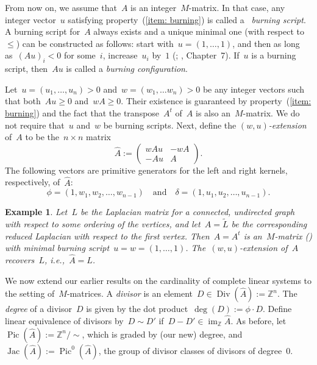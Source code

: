 \documentclass{amsart}
\newtheorem{Example}[thm]{Example}
\newenvironment{example}
  {\begin{Example}\rm}{\end{Example}}
\DeclareMathOperator{\Pic}{Pic}
\DeclareMathOperator{\Jac}{Jac}
\DeclareMathOperator{\Div}{Div}
\DeclareMathOperator{\im}{im}
\newcommand{\Z}{\mathbb{Z}}
\newcommand{\tL}{\tilde{L}}
\newcommand{\wA}{\widehat{A}}
\begin{document}
From now on, we assume that~$A$ is an integer~$M$-matrix.  In that case, any
integer vector~$u$ satisfying property~(\ref{item: burning}) is called a~{\em
burning script}.  A burning script for~$A$ always exists and a unique minimal
one (with respect to~$\leq$) can be constructed as follows: start
with~$u=(1,\dots,1)$, and then as long as~$(Au)_i<0$ for some~$i$,
increase~$u_i$ by~$1$ (\cite{PPW}; \cite{Corry}, Chapter~7). If~$u$ is a burning
script, then~$Au$ is called a {\em burning configuration}.

Let~$u=(u_1,\dots,u_n)>0$ and~$w=(w_1,\dots w_n)>0$ be any integer vectors such that both~$Au\geq0$
and~$wA\geq0$. Their existence is guaranteed by property~(\ref{item: burning}) and
the fact that the transpose~$A^t$ of~$A$ is also an~$M$-matrix. We
do not require that~$u$ and~$w$ be burning scripts.  Next, define the {\em
$(w,u)$-extension} of~$A$ to be the~$n\times n$ matrix
\[
  \wA:=
  \left(\begin{array}{c|c}
      wAu&-wA\\\hline
      -Au&A
  \end{array} \right).
\]
The following vectors are primitive generators for the left and right kernels,
respectively, of~$\wA$:
\[
  \phi=(1,w_1,w_2,\dots,w_{n-1})
  \quad\text{and}\quad
  \delta=(1,u_1,u_2,\dots,u_{n-1}).
\]

\begin{example} Let~$L$ be the Laplacian matrix for a connected, undirected
  graph with respect to some ordering of the vertices, and let~$A=\tL$ be the
  corresponding reduced Laplacian with respect to the first vertex.
  Then~$A=A^t$ is an~$M$-matrix (\cite{Guzman}) with minimal
  burning script~$u=w=(1,\dots,1)$.  The~$(w,u)$-extension of~$A$
  recovers~$L$, i.e.,~$\wA=L$. 
\end{example}

We now extend our earlier results on the cardinality of complete linear systems
to the setting of~$M$-matrices.  A {\em divisor} is an
element~$D\in\Div(\wA):=\Z^n$.  The {\em degree} of a divisor~$D$ is given by
the dot product~$\deg(D):=\phi\cdot D$.  Define linear equivalence of divisors
by~$D\sim D'$ if~$D-D'\in\im_{\Z}\wA$.  As before,
let~$\Pic(\wA):=\Z^{n}/\!\sim$, which is graded by (our new) degree,
and~$\Jac(\wA):=\Pic^{0}(\wA)$, the group of divisor classes of divisors of
degree~$0$.  

\end{document}

